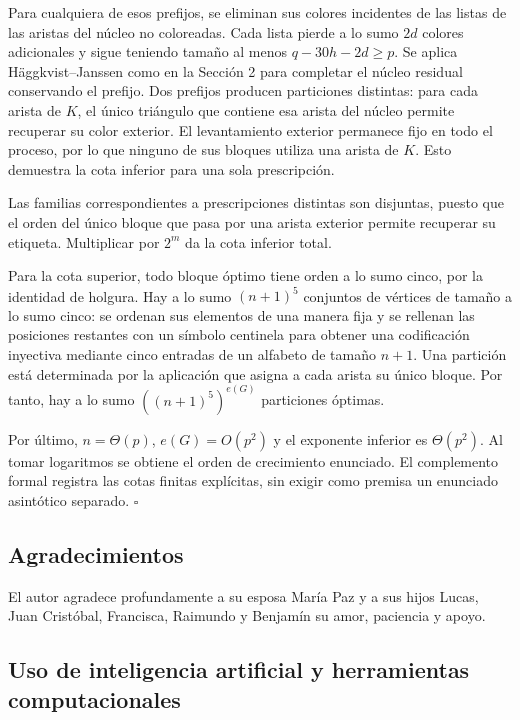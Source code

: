 \documentclass[spanish,11pt,a4paper]{article}
\begin{document}
Para cualquiera de esos prefijos, se eliminan sus colores incidentes de
las listas de las aristas del núcleo no coloreadas. Cada lista pierde a
lo sumo \(2d\) colores adicionales y sigue teniendo tamaño al menos
\(q-30h-2d\ge p\). Se aplica Häggkvist--Janssen como en la Sección 2
para completar el núcleo residual conservando el prefijo. Dos prefijos
producen particiones distintas: para cada arista de \(K\), el único
triángulo que contiene esa arista del núcleo permite recuperar su color
exterior. El levantamiento exterior permanece fijo en todo el proceso,
por lo que ninguno de sus bloques utiliza una arista de \(K\). Esto
demuestra la cota inferior para una sola prescripción.

Las familias correspondientes a prescripciones distintas son disjuntas,
puesto que el orden del único bloque que pasa por una arista exterior
permite recuperar su etiqueta. Multiplicar por \(2^m\) da la cota
inferior total.

Para la cota superior, todo bloque óptimo tiene orden a lo sumo cinco,
por la identidad de holgura. Hay a lo sumo \((n+1)^5\) conjuntos de
vértices de tamaño a lo sumo cinco: se ordenan sus elementos de una
manera fija y se rellenan las posiciones restantes con un símbolo
centinela para obtener una codificación inyectiva mediante cinco
entradas de un alfabeto de tamaño \(n+1\). Una partición está
determinada por la aplicación que asigna a cada arista su único bloque.
Por tanto, hay a lo sumo \(((n+1)^5)^{e(G)}\) particiones óptimas.

Por último, \(n=\Theta(p)\), \(e(G)=O(p^2)\) y el exponente inferior es
\(\Theta(p^2)\). Al tomar logaritmos se obtiene el orden de crecimiento
enunciado. El complemento formal registra las cotas finitas explícitas,
sin exigir como premisa un enunciado asintótico separado. \(\square\)

\subsection{Agradecimientos}\label{agradecimientos}

El autor agradece profundamente a su esposa María Paz y a sus hijos
Lucas, Juan Cristóbal, Francisca, Raimundo y Benjamín su amor, paciencia
y apoyo.

\subsection{Uso de inteligencia artificial y herramientas
computacionales}\label{uso-de-inteligencia-artificial-y-herramientas-computacionales}
\end{document}

